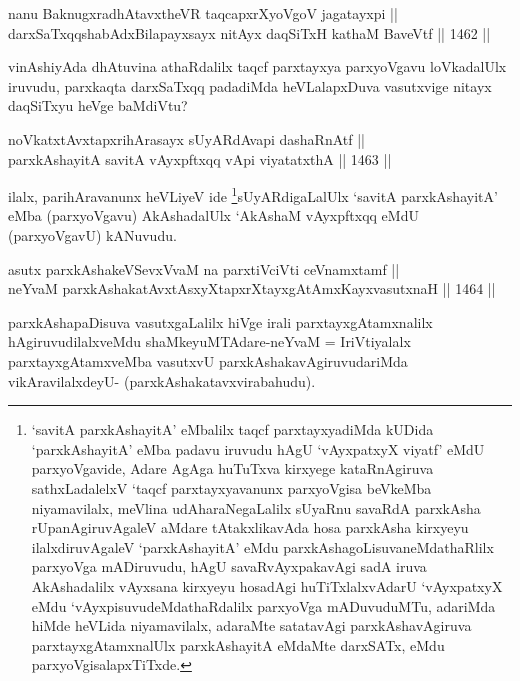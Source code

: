 
\begin{shl}
nanu BaknugxradhAtavxtheVR taqcapxrXyoVgoV jagatayxpi || \\
darxSaTxqqshabAdxBilapayxsayx nitAyx daqSiTxH kathaM BaveVtf \hfill || 1462 ||  
\end{shl}

\begin{artha}
vinAshiyAda dhAtuvina athaRdalilx taqcf parxtayxya parxyoVgavu loVkadalUlx iruvudu, parxkaqta darxSaTxqq padadiMda heVLalapxDuva vasutxvige nitayx daqSiTxyu heVge baMdiVtu?
\end{artha}


\begin{shl}
noVkatxtAvxtapxrihArasayx sUyARdAvapi dashaRnAtf || \\
parxkAshayitA savitA vAyxpftxqq vA\s pi viyatatxthA \hfill || 1463 ||  
\end{shl}

\begin{artha}
ilalx, parihAravanunx heVLiyeV ide \footnote{`savitA parxkAshayitA' eMbalilx taqcf parxtayxyadiMda kUDida `parxkAshayitA' eMba padavu iruvudu hAgU `vAyxpatxyX viyatf' eMdU parxyoVgavide, Adare AgAga huTuTxva kirxyege kataRnAgiruva sathxLadalelxV `taqcf parxtayxyavanunx parxyoVgisa beVkeMba niyamavilalx, meVlina udAharaNegaLalilx sUyaRnu savaRdA parxkAsha rUpanAgiruvAgaleV aMdare tAtakxlikavAda hosa parxkAsha kirxyeyu ilalxdiruvAgaleV `parxkAshayitA' eMdu parxkAshagoLisuvaneMdathaRlilx parxyoVga mADiruvudu, hAgU savaRvAyxpakavAgi sadA iruva AkAshadalilx vAyxsana kirxyeyu hosadAgi huTiTxlalxvAdarU `vAyxpatxyX eMdu `vAyxpisuvudeMdathaRdalilx parxyoVga mADuvuduMTu, adariMda hiMde heVLida niyamavilalx, adaraMte satatavAgi parxkAshavAgiruva parxtayxgAtamxnalUlx parxkAshayitA eMdaMte darxSATx, eMdu parxyoVgisalapxTiTxde.}sUyARdigaLalUlx `savitA parxkAshayitA' eMba (parxyoVgavu) AkAshadalUlx `AkAshaM vAyxpftxqq eMdU (parxyoVgavU) kANuvudu.
\end{artha}


\begin{shl}
asutx parxkAshakeVSevxVvaM na parxtiVciVti ceVnamxtamf || \\
neYvaM parxkAshakatAvxtAsxyXtapxrXtayxgAtAmxKayxvasutxnaH \hfill || 1464 ||  
\end{shl}

\begin{artha}
parxkAshapaDisuva vasutxgaLalilx hiVge irali parxtayxgAtamxnalilx hAgiruvudilalxveMdu shaMkeyuMTAdare-neYvaM = IriVtiyalalx parxtayxgAtamxveMba vasutxvU parxkAshakavAgiruvudariMda vikAravilalxdeyU- (parxkAshakatavxvirabahudu).
\end{artha}

